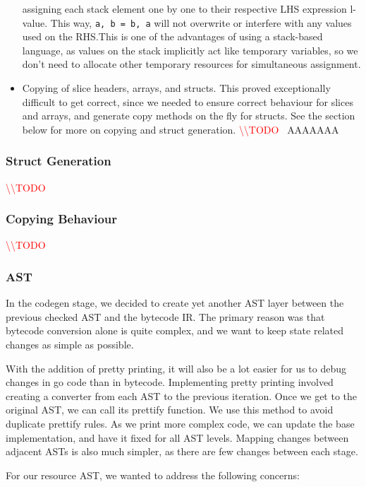 \documentclass[11pt]{article}
\newcommand{\todo}[0]{\textcolor{red}{\textbackslash\textbackslash TODO \ }}
\begin{document}
\begin{itemize}[noitemsep]
    assigning each stack element one by one to their respective LHS
    expression l-value. This way, \texttt{a, b = b, a} will not
    overwrite or interfere with any values used on the RHS.\@ This is
    one of the advantages of using a stack-based language, as values
    on the stack implicitly act like temporary variables, so we don't
    need to allocate other temporary resources for simultaneous
    assignment.
  \item Copying of slice headers, arrays, and structs. This proved
    exceptionally difficult to get correct, since we needed to ensure
    correct behaviour for slices and arrays, and generate copy methods
    on the fly for structs. See the section below for more on copying and
    struct generation. \todo AAAAAAA
\end{itemize}

\subsubsection{Struct Generation}

\todo

\subsubsection{Copying Behaviour}

\todo

\subsubsection{AST}
\label{sec:resource-ast}

In the codegen stage, we decided to create yet another AST layer between the previous checked AST and the bytecode IR. The primary reason was that bytecode conversion alone is quite complex, and we want to keep state related changes as simple as possible.

With the addition of pretty printing, it will also be a lot easier for us to debug changes in go code than in bytecode.
Implementing pretty printing involved creating a converter from each AST to the previous iteration.
Once we get to the original AST, we can call its prettify function.
We use this method to avoid duplicate prettify rules.
As we print more complex code, we can update the base implementation, and have it fixed for all AST levels.
Mapping changes between adjacent ASTs is also much simpler, as there are few changes between each stage.

For our resource AST, we wanted to address the following concerns:
\end{document}

